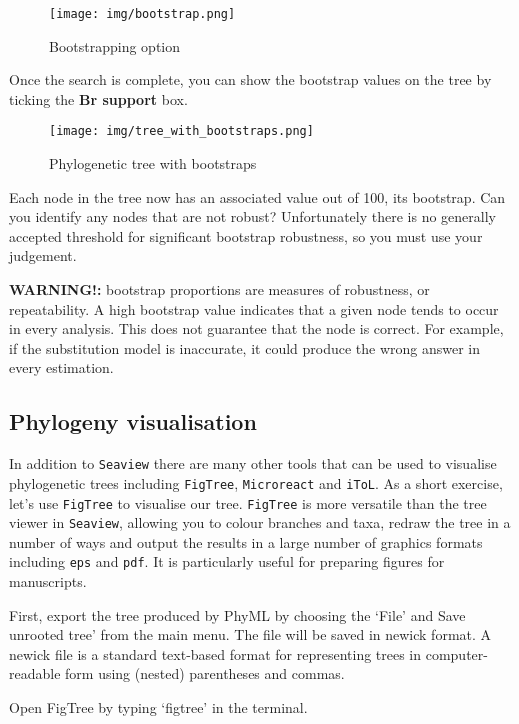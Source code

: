 \documentclass[11pt]{article}
\begin{document}
    \begin{figure}
\centering
\texttt{[image: img/bootstrap.png]}
\caption{Bootstrapping option}
\end{figure}

    Once the search is complete, you can show the bootstrap values on the
tree by ticking the \textbf{Br support} box.

    \begin{figure}
\centering
\texttt{[image: img/tree\_with\_bootstraps.png]}
\caption{Phylogenetic tree with bootstraps}
\end{figure}

    Each node in the tree now has an associated value out of 100, its
bootstrap. Can you identify any nodes that are not robust? Unfortunately
there is no generally accepted threshold for significant bootstrap
robustness, so you must use your judgement.

\textbf{WARNING!:} bootstrap proportions are measures of robustness, or
repeatability. A high bootstrap value indicates that a given node tends
to occur in every analysis. This does not guarantee that the node is
correct. For example, if the substitution model is inaccurate, it could
produce the wrong answer in every estimation.

    \hypertarget{phylogeny-visualisation}{%
\subsection{Phylogeny visualisation}\label{phylogeny-visualisation}}

In addition to \texttt{Seaview} there are many other tools that can be
used to visualise phylogenetic trees including \texttt{FigTree},
\texttt{Microreact} and \texttt{iToL}. As a short exercise, let's use
\texttt{FigTree} to visualise our tree. \texttt{FigTree} is more
versatile than the tree viewer in \texttt{Seaview}, allowing you to
colour branches and taxa, redraw the tree in a number of ways and output
the results in a large number of graphics formats including \texttt{eps}
and \texttt{pdf}. It is particularly useful for preparing figures for
manuscripts.

First, export the tree produced by PhyML by choosing the `File' and Save
unrooted tree' from the main menu. The file will be saved in newick
format. A newick file is a standard text-based format for representing
trees in computer-readable form using (nested) parentheses and commas.

Open FigTree by typing `figtree' in the terminal.
\end{document}
